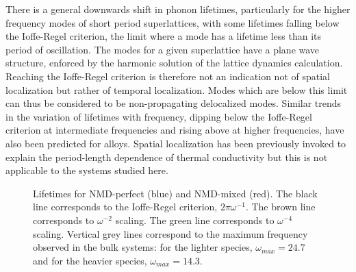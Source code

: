 \documentclass[aps,prb,preprint,preprintnumbers,amsmath,amssymb,floatfix,superscriptaddress]{revtex4}
\begin{document}
There is a general downwards shift in phonon lifetimes, particularly for the higher frequency modes of short period superlattices, with some lifetimes falling below the Ioffe-Regel criterion, the limit where a mode has a lifetime less than its period of oscillation. The modes for a given superlattice have a plane wave structure, enforced by the harmonic solution of the lattice dynamics calculation. Reaching the Ioffe-Regel criterion is therefore not an indication not of spatial localization but rather of temporal localization. Modes which are below this limit can thus be considered to be non-propagating delocalized modes.\cite{allen_thermal_1993} Similar trends in the variation of lifetimes with frequency, dipping below the Ioffe-Regel criterion at intermediate frequencies and rising above at higher frequencies, have also been predicted for alloys.\cite{jason2013vc} Spatial localization has been previously invoked to explain the period-length dependence of thermal conductivity \cite{PhysRevB.61.3091} but this is not applicable to the systems studied here.
\renewcommand{\textfraction}{0.0}
\begin{figure}%
\begin{center}
\renewcommand{\figure}{Fig.}
\caption{Lifetimes for NMD-perfect (blue) and NMD-mixed (red). The black line corresponds to the Ioffe-Regel criterion, $2\pi\omega^{-1}$. The brown line corresponds to $\omega^{-2}$ scaling. The green line corresponds to $\omega^{-4}$ scaling. Vertical grey lines correspond to the maximum frequency observed in the bulk systems: for the lighter species, $\omega_{max}=24.7$ and for the heavier species, $\omega_{max}=14.3$. } 
\label{FIG:lifetime}
\end{center}
\end{figure}
\end{document}
